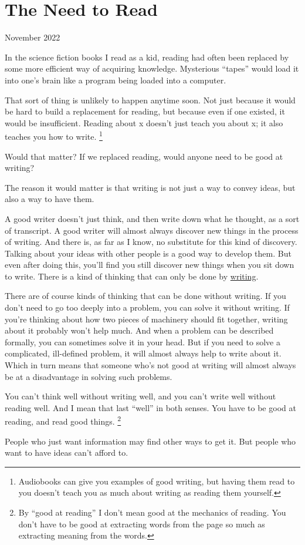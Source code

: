 \chapter{The Need to Read}

November 2022

In the science fiction books I read as a kid, reading had often been
replaced by some more efficient way of acquiring knowledge. Mysterious
``tapes'' would load it into one's brain like a program being loaded
into a computer.

That sort of thing is unlikely to happen anytime soon. Not just because
it would be hard to build a replacement for reading, but because even if
one existed, it would be insufficient. Reading about x doesn't just
teach you about x; it also teaches you how to write.
\footnote{Audiobooks can give you examples of good writing, but having
them read to you doesn't teach you as much about writing as reading them
yourself.}

Would that matter? If we replaced reading, would anyone need to be good
at writing?

The reason it would matter is that writing is not just a way to convey
ideas, but also a way to have them.

A good writer doesn't just think, and then write down what he thought,
as a sort of transcript. A good writer will almost always discover new
things in the process of writing. And there is, as far as I know, no
substitute for this kind of discovery. Talking about your ideas with
other people is a good way to develop them. But even after doing this,
you'll find you still discover new things when you sit down to write.
There is a kind of thinking that can only be done by
\href{words.html}{writing}.

There are of course kinds of thinking that can be done without writing.
If you don't need to go too deeply into a problem, you can solve it
without writing. If you're thinking about how two pieces of machinery
should fit together, writing about it probably won't help much. And when
a problem can be described formally, you can sometimes solve it in your
head. But if you need to solve a complicated, ill-defined problem, it
will almost always help to write about it. Which in turn means that
someone who's not good at writing will almost always be at a
disadvantage in solving such problems.

You can't think well without writing well, and you can't write well
without reading well. And I mean that last ``well'' in both senses. You
have to be good at reading, and read good things.
\footnote{By ``good at reading'' I don't mean good at the mechanics of
reading. You don't have to be good at extracting words from the page so
much as extracting meaning from the words.}

People who just want information may find other ways to get it. But
people who want to have ideas can't afford to.